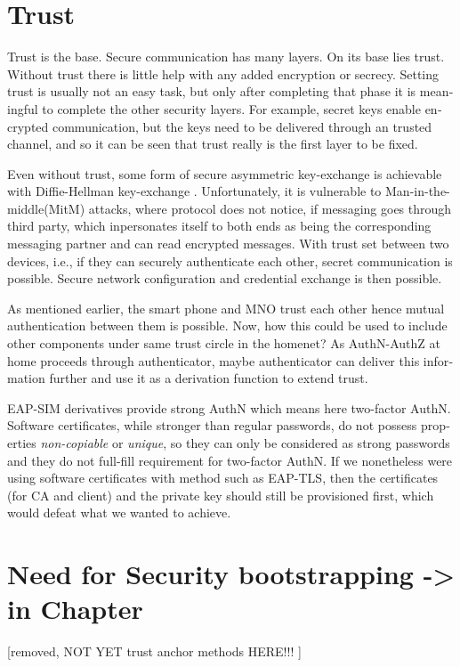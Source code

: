 \documentclass[12pt,a4paper,english]{tutthesis}
\begin{document}
\begin{otherlanguage}{english}
\section{Trust}
\label{sec-2-6}

Trust is the base.
Secure communication has many layers. On its base lies trust. Without
trust there is little help with any added encryption or
secrecy. Setting trust is usually not an easy task, but only after
completing that phase it is meaningful to complete the other security
layers.
For example, secret keys enable encrypted communication, but the keys need to be
delivered through an trusted channel, and so it can be seen that trust
really is the first layer to be fixed. 



Even without trust, some form of secure asymmetric key-exchange is achievable
with Diffie-Hellman key-exchange \cite{diffie1976new}. Unfortunately, it is vulnerable
to Man-in-the-middle(MitM) attacks, where protocol does not notice, 
if messaging goes through third party, which inpersonates itself to 
both ends as being the corresponding messaging partner and can
read encrypted messages.
With trust set between two devices, i.e.,  if they can securely
authenticate each other, secret communication is possible. 
Secure network configuration and credential exchange is then possible.


As mentioned earlier, the smart phone and MNO trust each other hence
mutual authentication between them is possible.  Now, how this could be used
to include other components under same trust circle in the homenet? 
As AuthN-AuthZ at home proceeds through authenticator, maybe
authenticator  can deliver this information further and use it as a
 derivation function to extend trust.

EAP-SIM derivatives provide strong AuthN which means here two-factor
AuthN. Software certificates, while stronger than regular passwords,
do not possess properties \emph{non-copiable} or \emph{unique}, so they can only
be considered as strong passwords and they do not full-fill 
requirement for two-factor AuthN.
If we nonetheless were using software certificates with method such as
EAP-TLS, then the certificates (for CA and client) and the private key
should still be provisioned first, which would defeat what we wanted
to achieve.


\section{Need for Security bootstrapping -> in Chapter}
\label{sec-2-7}
[removed, NOT YET trust anchor methods HERE!!! ]




\end{otherlanguage}
\end{document}
